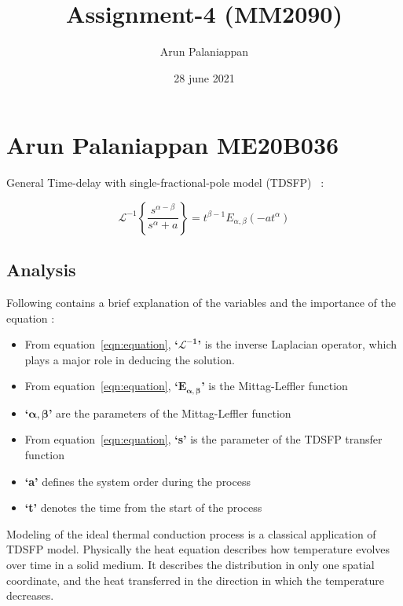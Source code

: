 \documentclass[a4paper, 12pt]{article}
\begin{document}
\title{Assignment-4 (MM2090)}
\author{Arun Palaniappan}
\date{28 june 2021}
\maketitle

\section{Arun Palaniappan ME20B036}

General Time-delay with single-fractional-pole model (TDSFP)~\cite{YUAN2022108111} :

\begin{equation}
 \mathcal{L}^{-1}\left \{\frac{s^{\alpha-\beta}}{s^{\alpha} + a} \right\} = t^{\beta-1}E_{\alpha,\beta}(-at^{\alpha})
 \label{eqn:equation}
\end{equation}

\subsection{Analysis}
Following contains a brief explanation of the variables and the importance of the equation :
\begin{itemize}

    \item From equation~\ref{eqn:equation}, \textbf{`$\bm{\mathcal{L}^{-1}}$'} is the inverse Laplacian operator, which plays a major role in deducing the solution.
    \item From equation~\ref{eqn:equation}, \textbf{`$\bm{E_{\alpha,\beta}}$'} is the Mittag-Leffler function
    \item \textbf{`$\bm{\alpha,\beta}$'} are the parameters of the Mittag-Leffler function
    \item From equation~\ref{eqn:equation}, \textbf{`s'} is the parameter of the TDSFP transfer function
    \item \textbf{`a'} defines the system order during the process
    \item \textbf{`t'} denotes the time from the start of the process
\end{itemize}
Modeling of the ideal thermal conduction process is a classical application of TDSFP model. Physically the heat equation describes how temperature evolves over time in a solid medium. It describes the distribution in only one spatial coordinate, and the heat transferred in the direction in which the temperature decreases.~\cite{YUAN2022108111}
\end{document}
